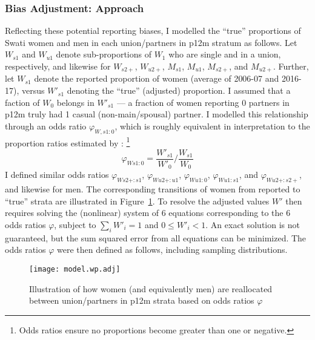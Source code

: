 \subsubsection{Bias Adjustment: Approach}\label{model.par.nsw.bias}
Reflecting these potential reporting biases,
I modelled the ``true'' proportions of Swati women and men
in each union/partners in p12m stratum as follows.
Let $W_{s1}$ and $W_{u1}$ denote sub-proportions of $W_{1}$ who are single and in a union, respectively,
and likewise for $W_{s2+}$, $W_{u2+}$, $M_{s1}$, $M_{u1}$, $M_{s2+}$, and $M_{u2+}$.
Further, let $W_{s1}$ denote the reported proportion of women (average of 2006-07 and 2016-17),
versus $W'_{s1}$ denoting the ``true'' (adjusted) proportion.
I assumed that a faction of $W_{0}$ belongs in $W'_{s1}$
--- \ie a fraction of women reporting 0 partners in p12m truly had 1 casual (non-main/spousal) partner.
I modelled this relationship through an odds ratio $\varphi_{W,s1:0}$,
which is roughly equivalent in interpretation to
the proportion ratios estimated by \citet{Behanzin2013}:%
\footnote{Odds ratios ensure no proportions become greater than one or negative.}
\begin{equation}\label{eq:Cwp-or}
  \varphi_{Ws1:0} = \frac{W'_{s1}}{W'_{0}} \bigg/ \frac{W_{s1}}{W_{0}}
\end{equation}
I defined similar odds ratios $\varphi_{Ws2+:s1}$, $\varphi_{Wu2+:u1}$,
$\varphi_{Wu1:0}$, $\varphi_{Wu1:s1}$, and $\varphi_{Wu2+:s2+}$, and likewise for men.
The corresponding transitions of women from reported to ``true'' strata
are illustrated in Figure~\ref{fig:model.nsw.adj}.
To resolve the adjusted values $W'$ then requires
solving the (nonlinear) system of 6 equations corresponding to the 6 odds ratios $\varphi$,
subject to $\sum_i W'_i = 1$ and $0 \le W'_i < 1$.
An exact solution is not guaranteed,
but the sum squared error from all equations can be minimized.
The odds ratios $\varphi$ were then defined as follows, including sampling distributions.
\begin{figure}
  \centering
  \texttt{[image: model.wp.adj]}
  \caption{Illustration of how women (and equivalently men)
    are reallocated between union/partners in p12m strata
    based on odds ratios $\varphi$}
  \label{fig:model.nsw.adj}
\end{figure}
